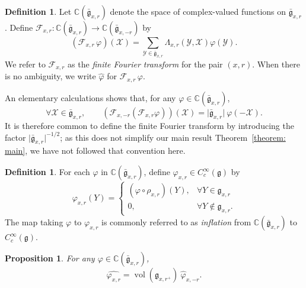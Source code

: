 \documentclass[11pt]{amsart}
\newtheorem{proposition}[theorem]{Proposition}
\theoremstyle{definition}
\newtheorem{definition}[theorem]{Definition}
\theoremstyle{remark}
\numberwithin{equation}{theorem}
\def\C{{\mathbb{C}}}
\def\gF{{\mathfrak{g}}}
\newcommand{\mf}{{\bar\gF}}
\def\vphi{{\varphi}}
\def\hphi{{\hat{\varphi}}}
\def\X{{\mathcal{X}}}
\def\Y{{\mathcal{Y}}}
\def\Fourier{{\mathcal{F}}}
\def\Sch#1{{C^\infty_c(#1)}}
\def\vol{{\operatorname{vol}}}
\def\vol{\operatorname{vol}}
\begin{document}
\begin{definition}\label{definition: finite Fourier transform}
Let $\C(\mf_{x,r})$ denote the space of complex-valued functions
on $\mf_{x,r}$. Define $\Fourier_{x,r} : \C(\mf_{x,r}) \to
\C(\mf_{x,-r})$ by
\begin{equation}
(\Fourier_{x,r}\, \vphi)(\X) = \sum_{\Y \in \mf_{x,r}}
\Lambda_{x,r}(\Y,\X) \vphi(\Y).
\end{equation}
We refer to $\Fourier_{x,r}$ as the {\em finite Fourier transform}
for the pair $(x,r)$. When there is no ambiguity, we write $\hphi$
for $\Fourier_{x,r}\, \vphi$.
\end{definition}

An elementary calculations shows that, for any
$\vphi\in\C(\mf_{x,r})$,
\begin{equation}
    \forall
    \X\in\mf_{x,r},\qquad (\Fourier_{x,-r}(
    \Fourier_{x,r} \vphi)) (\X) = {\vert\mf_{x,r}\vert}\
    \vphi(-\X).
\end{equation}
It is therefore common to define the finite Fourier transform by
introducing the factor ${\vert\mf_{x,r}\vert}^{-1/2}$; as this
does not simplify our main result Theorem~\ref{theorem: main}, we
have not followed that convention here.

\begin{definition}\label{definition: inflation}
For each $\vphi$ in $\C(\mf_{x,r})$, define $\vphi_{x,r} \in \Sch{\gF}$ by
\begin{equation}
\vphi_{x,r}(Y) =
\begin{cases}
(\vphi \circ \rho_{x,r})(Y),& \forall Y \in \gF_{x,r}\\
0,& \forall Y \not\in \gF_{x,r}.
\end{cases}
\end{equation}
The map taking $\vphi$ to $\vphi_{x,r}$ is commonly referred to as
{\em inflation} from $\C(\mf_{x,r})$ to $\Sch{\gF}$.
\end{definition}

\begin{proposition}\label{proposition: inflation and FT}
For any $\vphi \in \C(\mf_{x,r})$,
\begin{equation}
\widehat{\vphi_{x,r}} = \vol(\gF_{x,r^+})\ \hphi_{x,-r}.
\end{equation}
\end{proposition}
\end{document}
